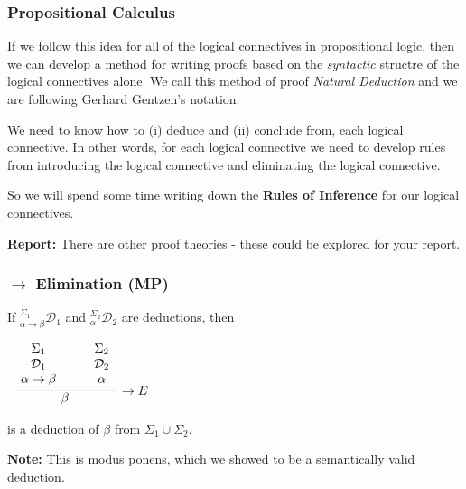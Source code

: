\documentclass{beamer}
\theoremstyle{indentDefn} \newtheorem{defn}[]{Definition}
\begin{document}
\begin{frame}
	\frametitle{Propositional Calculus}
	
	If we follow this idea for all of the logical connectives in propositional logic, then we can develop a method for writing proofs based on the \textit{syntactic} structre of the logical connectives alone. We call this method of proof \emph{Natural Deduction} and we are following Gerhard Gentzen's notation. 
	
	\vspace{0.5cm}
	
	We need to know how to (i) deduce and (ii) conclude from, each logical connective. In other words, for each logical connective we need to develop rules from introducing the logical connective and eliminating the logical connective.
	
	\vspace{0.5cm}
	
	So we will spend some time writing down the {\bf Rules of Inference} for our logical connectives. 
	
	
	\vspace{0.5cm}
	
	{\bf Report:} There are other proof theories - these could be explored for your report. 
\end{frame}

\begin{frame}
	\frametitle{$\rightarrow$ Elimination (MP)}
	
	If $^{\Sigma_{1}}_{\alpha \rightarrow \beta}\mathcal{D}_{1}$ and $^{\Sigma_{2}}_{\alpha}\mathcal{D}_{2}$ are deductions, then
	
	\vspace{0.5cm}
	
	\begin{center}
		$\begin{array}{c}		
			\infer[\rightarrow E]{\beta}{\begin{array}{c} \Sigma_{1} \\ \mathcal{D}_{1} \\ \alpha \rightarrow \beta \end{array} \quad & \begin{array}{c} \Sigma_{2} \\ \mathcal{D}_{2} \\ \alpha \end{array}}	
		\end{array}$
	\end{center}
	
	is a deduction of $\beta$ from $\Sigma_{1} \cup \Sigma_{2}$.
	
	\vspace{1cm}
	
	{\bf Note:} This is modus ponens, which we showed to be a semantically valid deduction.
\end{frame}
\end{document}
